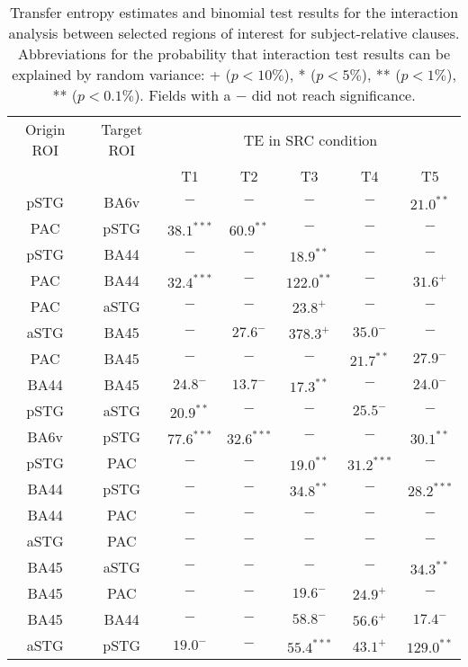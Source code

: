 \begin{table}[h]
\begin{center}
\begin{tabular}{ccccccc}
Origin ROI & Target ROI & \multicolumn{5}{c}{TE in SRC condition} \\
           &            &      T1 & T2 & T3 & T4 & T5             \\ \hline

pSTG & BA6v & $-$ & $-$ & $-$ & $-$ & $21.0^{**}$ \\ 
PAC & pSTG & $38.1^{***}$ & $60.9^{**}$ & $-$ & $-$ & $-$ \\ 
pSTG & BA44 & $-$ & $-$ & $18.9^{**}$ & $-$ & $-$ \\ 
PAC & BA44 & $32.4^{***}$ & $-$ & $122.0^{**}$ & $-$ & $31.6^{+}$ \\ 
PAC & aSTG & $-$ & $-$ & $23.8^{+}$ & $-$ & $-$ \\ 
aSTG & BA45 & $-$ & $27.6^{-}$ & $378.3^{+}$ & $35.0^{-}$ & $-$ \\ 
PAC & BA45 & $-$ & $-$ & $-$ & $21.7^{**}$ & $27.9^{-}$ \\ 
BA44 & BA45 & $24.8^{-}$ & $13.7^{-}$ & $17.3^{**}$ & $-$ & $24.0^{-}$ \\ 
pSTG & aSTG & $20.9^{**}$ & $-$ & $-$ & $25.5^{-}$ & $-$ \\ 
BA6v & pSTG & $77.6^{***}$ & $32.6^{***}$ & $-$ & $-$ & $30.1^{**}$ \\ 
pSTG & PAC & $-$ & $-$ & $19.0^{**}$ & $31.2^{***}$ & $-$ \\ 
BA44 & pSTG & $-$ & $-$ & $34.8^{**}$ & $-$ & $28.2^{***}$ \\ 
BA44 & PAC & $-$ & $-$ & $-$ & $-$ & $-$ \\ 
aSTG & PAC & $-$ & $-$ & $-$ & $-$ & $-$ \\ 
BA45 & aSTG & $-$ & $-$ & $-$ & $-$ & $34.3^{**}$ \\ 
BA45 & PAC & $-$ & $-$ & $19.6^{-}$ & $24.9^{+}$ & $-$ \\ 
BA45 & BA44 & $-$ & $-$ & $58.8^{-}$ & $56.6^{+}$ & $17.4^{-}$ \\ 
aSTG & pSTG & $19.0^{-}$ & $-$ & $55.4^{***}$ & $43.1^{+}$ & $129.0^{**}$ \\ 
\end{tabular}
\caption{\label{4.4.TEvalues.b} Transfer entropy estimates and binomial test results for the interaction analysis between selected regions of interest for subject-relative clauses. Abbreviations for the probability that interaction test results can be explained by random variance: + ($p < 10\%$), * ($p < 5\%$), ** ($p < 1\%$), ** ($p < 0.1\%$). Fields with a $-$ did not reach significance.}
\end{center}
\end{table}
\vspace{5mm}


